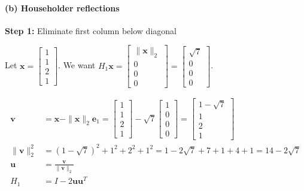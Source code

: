 \paragraph*{(b) Householder reflections}

\textbf{Step 1:} Eliminate first column below diagonal

Let $\mathbf{x} = \begin{bmatrix} 1 \\ 1 \\ 2 \\ 1 \end{bmatrix}$. We want $H_1 \mathbf{x} = \begin{bmatrix} \|\mathbf{x}\|_2 \\ 0 \\ 0 \\ 0 \end{bmatrix} = \begin{bmatrix} \sqrt{7} \\ 0 \\ 0 \\ 0 \end{bmatrix}$.

\begin{align*}
    \mathbf{v}         & = \mathbf{x} - \|\mathbf{x}\|_2 \mathbf{e}_1 = \begin{bmatrix} 1 \\ 1 \\ 2 \\ 1 \end{bmatrix} - \sqrt{7} \begin{bmatrix} 1 \\ 0 \\ 0 \\ 0 \end{bmatrix} = \begin{bmatrix} 1 - \sqrt{7} \\ 1 \\ 2 \\ 1 \end{bmatrix} \\
    \|\mathbf{v}\|_2^2 & = (1-\sqrt{7})^2 + 1^2 + 2^2 + 1^2 = 1 - 2\sqrt{7} + 7 + 1 + 4 + 1 = 14 - 2\sqrt{7}                                                                                                                                 \\
    \mathbf{u}         & = \frac{\mathbf{v}}{\|\mathbf{v}\|_2}                                                                                                                                                                               \\
    H_1                & = I - 2\mathbf{u}\mathbf{u}^T
\end{align*}

